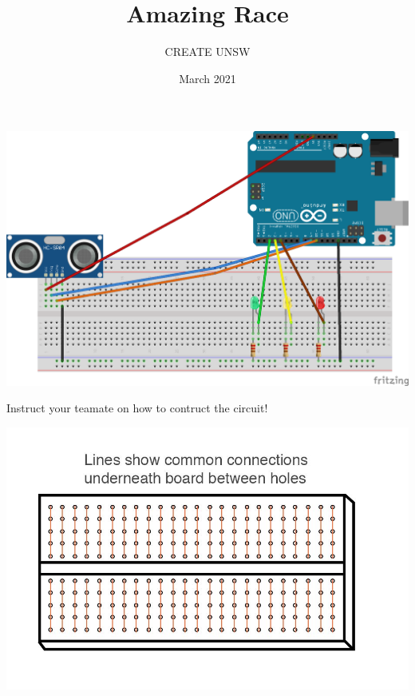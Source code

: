 \documentclass{article}
\title{Amazing Race}
\author{CREATE UNSW}
\date{March 2021}
\begin{document}
\includegraphics[width=\textwidth]{amazing race_bb.png}

Instruct your teamate on how to contruct the circuit!

\includegraphics[width=\textwidth]{breadboard.jpeg}
\end{document}
